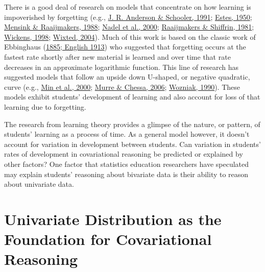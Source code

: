 \documentclass[11pt]{umnthesis}
\begin{document}
There is a good deal of research on models that concentrate on how learning is impoverished by forgetting (e.g., \protect\hyperlink{ref-anderson:1991}{J. R. Anderson \& Schooler, 1991}; \protect\hyperlink{ref-estes:1950}{Estes, 1950}; \protect\hyperlink{ref-mensink:1988}{Mensink \& Raaijmakers, 1988}; \protect\hyperlink{ref-nadel:2000}{Nadel et al., 2000}; \protect\hyperlink{ref-raaijmakers:1981}{Raaijmakers \& Shiffrin, 1981}; \protect\hyperlink{ref-wickens:1998}{Wickens, 1998}; \protect\hyperlink{ref-wixted:2004}{Wixted, 2004}). Much of this work is based on the classic work of Ebbinghaus (\protect\hyperlink{ref-ebbinghaus:1885}{1885; English 1913}) who suggested that forgetting occurs at the fastest rate shortly after new material is learned and over time that rate decreases in an approximate logarithmic function. This line of research has suggested models that follow an upside down U-shaped, or negative quadratic, curve (e.g., \protect\hyperlink{ref-min:2000}{Min et al., 2000}; \protect\hyperlink{ref-murre:2006}{Murre \& Chessa, 2006}; \protect\hyperlink{ref-wozniak:1990}{Wozniak, 1990}). These models exhibit students' development of learning and also account for loss of that learning due to forgetting.

The research from learning theory provides a glimpse of the nature, or pattern, of students' learning as a process of time. As a general model however, it doesn't account for variation in development between students. Can variation in students' rates of development in covariational reasoning be predicted or explained by other factors? One factor that statistics education researchers have speculated may explain students' reasoning about bivariate data is their ability to reason about univariate data.

\hypertarget{univariate-distribution-as-the-foundation-for-covariational-reasoning}{%
\section{Univariate Distribution as the Foundation for Covariational Reasoning}\label{univariate-distribution-as-the-foundation-for-covariational-reasoning}}
\end{document}
